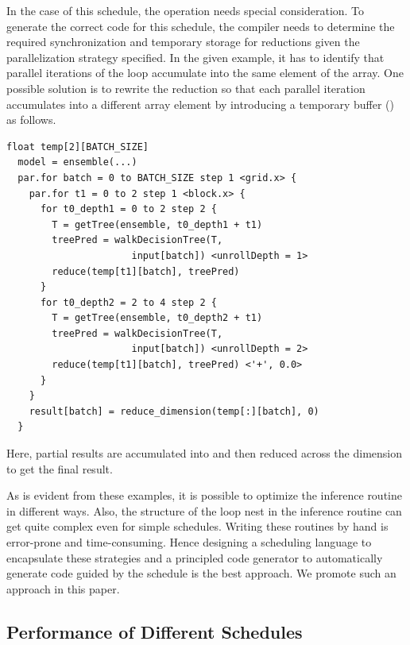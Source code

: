 In the case of this schedule, the 
operation needs special consideration.  
To generate the correct code for this schedule, the compiler needs to determine
the required synchronization and temporary storage for reductions 
given the parallelization strategy specified. In the given example, it 
has to identify that parallel iterations of the  
loop accumulate into the same element of the  array.
One possible solution is to rewrite the reduction so that each parallel 
iteration accumulates into a different array element by introducing 
a temporary buffer () as follows.
\begin{lstlisting}[style=c++]
  float temp[2][BATCH_SIZE]
  model = ensemble(...)
  par.for batch = 0 to BATCH_SIZE step 1 <grid.x> {
    par.for t1 = 0 to 2 step 1 <block.x> {
      for t0_depth1 = 0 to 2 step 2 {
        T = getTree(ensemble, t0_depth1 + t1)
        treePred = walkDecisionTree(T, 
                      input[batch]) <unrollDepth = 1>
        reduce(temp[t1][batch], treePred)
      }
      for t0_depth2 = 2 to 4 step 2 {
        T = getTree(ensemble, t0_depth2 + t1)
        treePred = walkDecisionTree(T,
                      input[batch]) <unrollDepth = 2>
        reduce(temp[t1][batch], treePred) <'+', 0.0>
      }
    }
    result[batch] = reduce_dimension(temp[:][batch], 0)
  }
\end{lstlisting}
Here, partial results are accumulated into  and then
reduced across the  dimension to get the final result.

As is evident from these examples, it is possible to optimize 
the inference routine in different ways. Also, the structure of the loop 
nest in the inference routine can get quite complex even 
for simple schedules. Writing these routines by hand 
is error-prone and time-consuming.  
Hence designing a 
scheduling language to encapsulate these strategies and a principled code 
generator to automatically generate code guided by the schedule is the 
best approach. We promote such an approach in this paper.

\subsection{Performance of Different Schedules} 

